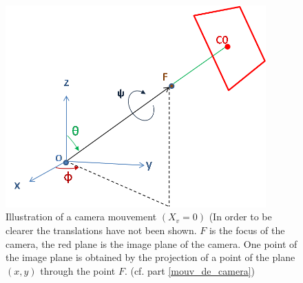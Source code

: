 \begin{figure}[h!]

\centering
\includegraphics[width=10cm]{shema_decomp.png}
\caption{Illustration of a camera mouvement $(X_v =0)$ (In order to be clearer the translations have not been shown. $F$ is the focus of the camera, the red plane is the image plane of the camera.  One point of the image plane is obtained by the projection of a point of the plane $(x,y)$ through the point $F$. (cf. part \ref{mouv_de_camera})}
\label{shmdecomp}
\end{figure}

